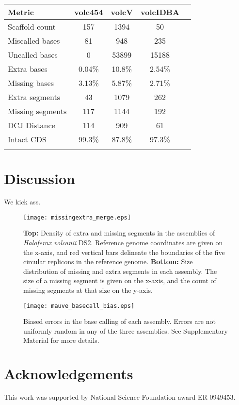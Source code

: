 \documentclass{bioinfo}
\begin{document}
\begin{table}[!t]
{\begin{tabular}{l|cccc}\toprule
Metric & volc454 & volcV & volcIDBA \\\midrule
Scaffold count & 157 & 1394 & 50  \\
Miscalled bases & 81 & 948 & 235  \\
Uncalled bases & 0 & 53899 & 15188  \\
Extra bases & 0.04\% & 10.8\% & 2.54\%  \\
Missing bases & 3.13\% & 5.87\% & 2.71\%  \\
Extra segments & 43 & 1079 & 262 \\
Missing segments & 117 & 1144 & 192  \\
DCJ Distance & 114 & 909 & 61 \\
Intact CDS & 99.3\% & 87.8\% & 97.3\% \\
\botrule
\end{tabular}}{}
\vspace{-1cm}
\end{table}



\section{Discussion}

We kick ass.

\begin{figure}[t]
\texttt{[image: missingextra\_merge.eps]}
\vspace{-1cm}
\caption{\textbf{Top:} Density of extra and missing segments in the assemblies of \textit{Haloferax volcanii} DS2.
Reference genome coordinates are given on the x-axis, and red vertical bars delineate the boundaries of the
five circular replicons in the reference genome. \textbf{Bottom:} Size distribution of missing and extra segments in each assembly.  The size of a missing segment is given on the x-axis, and the count of missing segments at that size on the y-axis.}\label{fig:01}
\end{figure}

\begin{figure}[t]
\texttt{[image: mauve\_basecall\_bias.eps]}
\vspace{-1cm}
\caption{Biased errors in the base calling of each assembly. Errors are not uniformly random in any of the three assemblies. See Supplementary Material for more details.}\label{fig:02}
\end{figure}



\section*{Acknowledgements}
This work was supported by National Science Foundation award ER 0949453.



\end{document}
